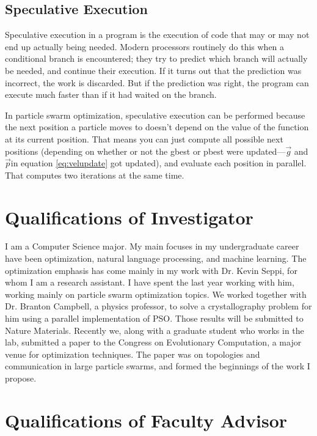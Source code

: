 \documentclass[onecolumn, 12pt]{article}
\providecommand{\gbest}{\ensuremath{\Vec{g}}}
\providecommand{\pbest}{\ensuremath{\Vec{p}}}
\begin{document}
\subsection{Speculative Execution}

Speculative execution in a program is the execution of code that may or may not
end up actually being needed.  Modern processors routinely do this when a
conditional branch is encountered; they try to predict which branch will
actually be needed, and continue their execution.  If it turns out that the
prediction was incorrect, the work is discarded.  But if the prediction was
right, the program can execute much faster than if it had waited on the branch.  

In particle swarm optimization, speculative execution can be performed because
the next position a particle moves to doesn't depend on the value of the
function at its current position.  That means you can just compute all possible
next positions (depending on whether or not the gbest or pbest were updated---\gbest 
and \pbest in equation \ref{eq:velupdate} got updated), and evaluate each position 
in parallel.  That computes two iterations at the same time.

\section{Qualifications of Investigator}

I am a Computer Science major.  My main focuses in my undergraduate career have
been optimization, natural language processing, and machine learning.  The
optimization emphasis has come mainly in my work with Dr. Kevin Seppi, for whom
I am a research assistant.  I have spent the last year working with him,
working mainly on particle swarm optimization topics.  We worked together with
Dr. Branton Campbell, a physics professor, to solve a crystallography problem
for him using a parallel implementation of PSO.  Those results will be
submitted to Nature Materials.  Recently we, along with a graduate student who
works in the lab, submitted a paper to the Congress on Evolutionary
Computation, a major venue for optimization techniques.  The paper was on
topologies and communication in large particle swarms, and formed the
beginnings of the work I propose.

\section{Qualifications of Faculty Advisor}
\end{document}
